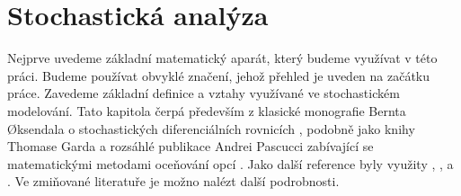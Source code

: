 \documentclass[a4paper,12pt]{report}
\theoremstyle{definition} \newtheorem{definice}[veta]{Definice}
\theoremstyle{remark}
\begin{document}

\chapter{Stochastická analýza}
Nejprve uvedeme základní matematický aparát, který budeme využívat v této práci.
Budeme používat obvyklé značení, jehož přehled je uveden na začátku práce. 
Zavedeme základní definice a vztahy využívané ve stochastickém modelování.
Tato kapitola čerpá především z klasické monografie Bernta {\O}ksendala o stochastických diferenciálních rovnicích \cite{oksendal2003stochastic}, 
podobně jako knihy Thomase Garda  \cite{gard} 
a rozsáhlé publikace Andrei Pascucci zabívající se matematickými metodami oceňování opcí \cite{pascucci}.
Jako další reference byly využity \cite{karatzas2012brownian}, \cite{allen2010introduction},  \cite{shreve2012stochastic} a \cite{shreve2004stochastic}.
Ve zmiňované literatuře je možno nalézt další podrobnosti.
\end{document}
